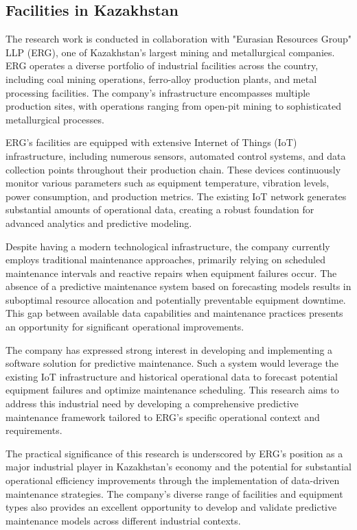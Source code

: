 \subsection{Facilities in Kazakhstan}

The research work is conducted in collaboration with "Eurasian Resources Group" LLP (ERG), one of Kazakhstan's largest mining and metallurgical companies. ERG operates a diverse portfolio of industrial facilities across the country, including coal mining operations, ferro-alloy production plants, and metal processing facilities. The company's infrastructure encompasses multiple production sites, with operations ranging from open-pit mining to sophisticated metallurgical processes.

ERG's facilities are equipped with extensive Internet of Things (IoT) infrastructure, including numerous sensors, automated control systems, and data collection points throughout their production chain. These devices continuously monitor various parameters such as equipment temperature, vibration levels, power consumption, and production metrics. The existing IoT network generates substantial amounts of operational data, creating a robust foundation for advanced analytics and predictive modeling.

Despite having a modern technological infrastructure, the company currently employs traditional maintenance approaches, primarily relying on scheduled maintenance intervals and reactive repairs when equipment failures occur. The absence of a predictive maintenance system based on forecasting models results in suboptimal resource allocation and potentially preventable equipment downtime. This gap between available data capabilities and maintenance practices presents an opportunity for significant operational improvements.

The company has expressed strong interest in developing and implementing a software solution for predictive maintenance. Such a system would leverage the existing IoT infrastructure and historical operational data to forecast potential equipment failures and optimize maintenance scheduling. This research aims to address this industrial need by developing a comprehensive predictive maintenance framework tailored to ERG's specific operational context and requirements.

The practical significance of this research is underscored by ERG's position as a major industrial player in Kazakhstan's economy and the potential for substantial operational efficiency improvements through the implementation of data-driven maintenance strategies. The company's diverse range of facilities and equipment types also provides an excellent opportunity to develop and validate predictive maintenance models across different industrial contexts.

